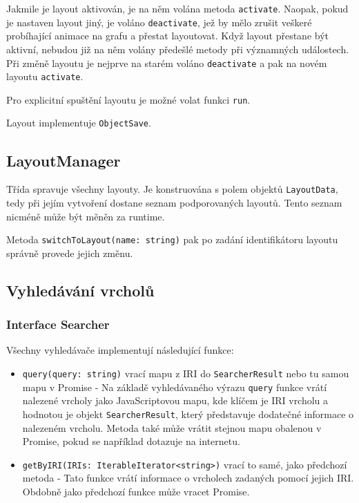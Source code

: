 Jakmile je layout aktivován, je na něm volána metoda \texttt{activate}. Naopak, pokud je nastaven layout jiný, je voláno \texttt{deactivate}, jež by mělo zrušit veškeré probíhající animace na grafu a přestat layoutovat. Když layout přestane být aktivní, nebudou již na něm volány předešlé metody při významných událostech. Při změně layoutu je nejprve na starém voláno \texttt{deactivate} a pak na novém layoutu \texttt{activate}.

Pro explicitní spuštění layoutu je možné volat funkci \texttt{run}.

Layout implementuje \texttt{ObjectSave}.

\subsection{LayoutManager}
Třída spravuje všechny layouty. Je konstruována s polem objektů \texttt{LayoutData}, tedy při jejím vytvoření dostane seznam podporovaných layoutů. Tento seznam nicméně může být měněn za runtime.

Metoda \texttt{switchToLayout(name: string)} pak po zadání identifikátoru layoutu správně provede jejich změnu.

\subsection{Vyhledávání vrcholů}
\subsubsection{Interface Searcher}
Všechny vyhledávače implementují následující funkce:
\begin{itemize}
  \item \texttt{query(query: string)} vrací mapu z IRI do \texttt{SearcherResult} nebo tu samou mapu v Promise - Na základě vyhledávaného výrazu \texttt{query} funkce vrátí nalezené vrcholy jako JavaScriptovou mapu, kde klíčem je IRI vrcholu a hodnotou je objekt \texttt{SearcherResult}, který představuje dodatečné informace o nalezeném vrcholu. Metoda také může vrátit stejnou mapu obalenou v Promise, pokud se například dotazuje na internetu.
  \item \texttt{getByIRI(IRIs: IterableIterator<string>)} vrací to samé, jako předchozí metoda - Tato funkce vrátí informace o vrcholech zadaných pomocí jejich IRI. Obdobně jako předchozí funkce může vracet Promise.
\end{itemize}

